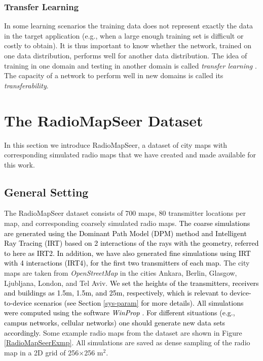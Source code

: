 \documentclass[10pt,a4paper]{article}
\begin{document}
\subsubsection{Transfer Learning}

In some learning scenarios the training data does not represent exactly the data in the target application (e.g., when a large enough training set is difficult or costly to obtain).
It is thus important to know whether the network, trained on one data distribution, performs well for another data distribution. 
The idea of training in one domain and testing in another domain is called \emph{transfer learning} \cite{transfer1,transfer2}. 
The capacity of a network to perform well in new domains is called its \emph{transferability}.



\section{The RadioMapSeer Dataset}

In this section we introduce RadioMapSeer, a dataset of city maps with corresponding simulated radio maps that we have created and made available for this work.

\subsection{General Setting}
\label{General Setting}

The RadioMapSeer dataset consists of 700 maps, 80 transmitter locations per map, and corresponding coarsely simulated radio maps. \textcolor{black}{The coarse simulations are generated using 
the Dominant Path Model (DPM)  method \cite{dominantPathUrban}
and Intelligent Ray Tracing (IRT) \cite{IRT} based on 2 interactions of the rays with the geometry, referred to here as IRT2.
In addition, we have also generated fine simulations using IRT with 4 interactions (IRT4), for the first two transmitters of each map.}
The city maps are taken from \emph{OpenStreetMap} \cite{OpenStreetMap} in the cities Ankara, Berlin, Glasgow, Ljubljana, London, and Tel Aviv. 
\textcolor{black}{We set the heights of the transmitters, receivers and buildings as 1.5m, 1.5m, and 25m, respectively,} \textcolor{black}{which is relevant to  device-to-device 
scenarios (see Section \ref{sys-param} for more details). All simulations were computed using the software \emph{WinProp} \cite{WinPropFEKO}.
For different situations (e.g., campus networks, cellular networks) one should generate new data sets 
accordingly.} Some example radio maps from the dataset are shown in Figure \ref{RadioMapSeerExmp}.
All simulations are saved as dense sampling of the radio map in a 2D grid of 256$\times$256 m$^2$.
\end{document}
